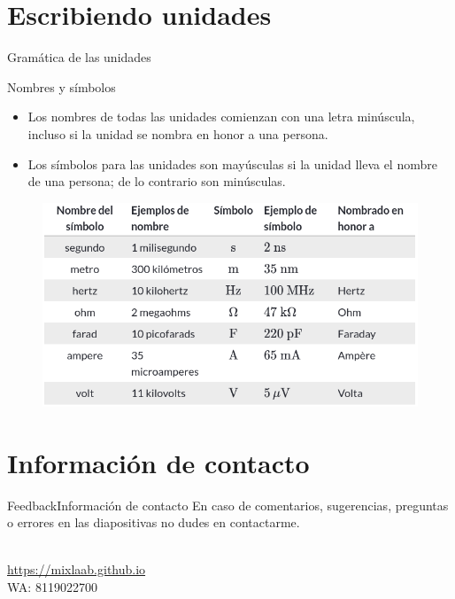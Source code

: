 \documentclass[10pt]{beamer}
\newcommand{\chref}[2]{%
  \href{#1}{{\usebeamercolor[bg]{Aalborg}#2}}%
}
\begin{document}
\section{Escribiendo unidades}

\begin{frame}{Gramática de las unidades}{}
\begin{block}{Nombres y símbolos}
\begin{itemize}
    \item Los nombres de todas las unidades comienzan con una letra minúscula, incluso si la unidad se nombra en honor a una persona.
    \item Los símbolos para las unidades son mayúsculas si la unidad lleva el nombre de una persona; de lo contrario son minúsculas.
\end{itemize}
\end{block}

\begin{figure}[h!]
\centering
\includegraphics [scale=0.28]{gram}
\label{fig:first}
\end{figure}

\end{frame}

\section{Información de contacto}
\begin{frame}{Feedback}{Información de contacto}
En caso de comentarios, sugerencias, preguntas o errores en las diapositivas no dudes en contactarme.
  \begin{center}
    \insertauthor\\
    \chref{https://mixlaab.github.io}{https://mixlaab.github.io}\\
    WA: 8119022700\\
  \end{center}
\end{frame}

{\aauwavesbg%
\begin{frame}%
\end{frame}}
\end{document}
